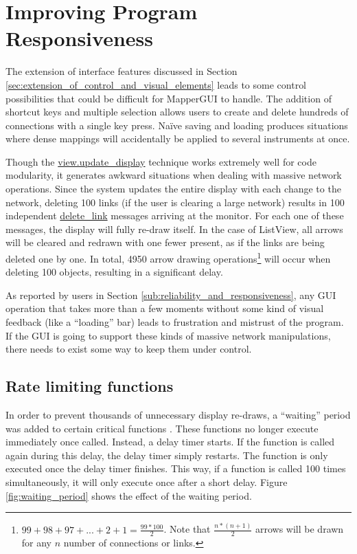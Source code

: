 \section{Improving Program Responsiveness} %
\label{sec:testing_program_responsiveness}

The extension of interface features discussed in Section \ref{sec:extension_of_control_and_visual_elements} leads to some control possibilities that could be difficult for MapperGUI to handle. The addition of shortcut keys and multiple selection allows users to create and delete hundreds of connections with a single key press. Na\"{i}ve saving and loading produces situations where dense mappings will accidentally be applied to several instruments at once.

Though the \url{view.update_display} technique works extremely well for code modularity, it generates awkward situations when dealing with massive network operations. Since the system updates the entire display with each change to the network, deleting 100 links (if the user is clearing a large network) results in 100 independent \url{delete_link} messages arriving at the monitor. For each one of these messages, the display will fully re-draw itself. In the case of ListView, all arrows will be cleared and redrawn with one fewer present, as if the links are being deleted one by one. In total, 4950 arrow drawing operations\footnote{$99 + 98 + 97 + ... + 2 + 1 = \frac{99*100}{2}$. Note that $\frac{n*(n+1)}{2}$ arrows will be drawn for any $n$ number of connections or links.} will occur when deleting 100 objects, resulting in a significant delay. 

As reported by users in Section \ref{sub:reliability_and_responsiveness}, any GUI operation that takes more than a few moments without some kind of visual feedback (like a ``loading'' bar) leads to frustration and mistrust of the program. If the GUI is going to support these kinds of massive network manipulations, there needs to exist some way to keep them under control.

	\subsection{Rate limiting functions} %
	\label{sub:rate_limiting_certain_functions}

In order to prevent thousands of unnecessary display re-draws, a ``waiting'' period was added to certain critical functions . These functions no longer execute immediately once called. Instead, a delay timer starts. If the function is called again during this delay, the delay timer simply restarts. The function is only executed once the delay timer finishes. This way, if a function is called 100 times simultaneously, it will only execute once after a short delay. Figure \ref{fig:waiting_period} shows the effect of the waiting period.

